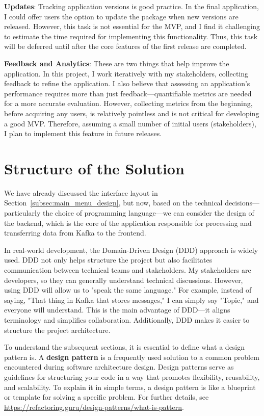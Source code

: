 \documentclass[10pt , a4paper]{report}
\begin{document}
\textbf{Updates}: Tracking application versions is good practice. In the final application, I could offer users the option to update the package when new versions are released. However, this task is not essential for the MVP, and I find it challenging to estimate the time required for implementing this functionality. Thus, this task will be deferred until after the core features of the first release are completed.

\textbf{Feedback and Analytics}: These are two things that help improve the application. In this project, I work iteratively with my stakeholders, collecting feedback to refine the application. I also believe that assessing an application's performance requires more than just feedback—quantifiable metrics are needed for a more accurate evaluation. However, collecting metrics from the beginning, before acquiring any users, is relatively pointless and is not critical for developing a good MVP. Therefore, assuming a small number of initial users (stakeholders), I plan to implement this feature in future releases.

\section{Structure of the Solution}

We have already discussed the interface layout in Section~\ref{subsec:main_menu_design}, but now, based on the technical decisions—particularly the choice of programming language—we can consider the design of the backend, which is the core of the application responsible for processing and transferring data from Kafka to the frontend.

In real-world development, the Domain-Driven Design (DDD) approach is widely used. DDD not only helps structure the project but also facilitates communication between technical teams and stakeholders. My stakeholders are developers, so they can generally understand technical discussions. However, using DDD will allow us to "speak the same language." For example, instead of saying, "That thing in Kafka that stores messages," I can simply say "Topic," and everyone will understand. This is the main advantage of DDD—it aligns terminology and simplifies collaboration. Additionally, DDD makes it easier to structure the project architecture.

To understand the subsequent sections, it is essential to define what a design pattern is. A \textbf{design pattern} is a frequently used solution to a common problem encountered during software architecture design. Design patterns serve as guidelines for structuring your code in a way that promotes flexibility, reusability, and scalability. To explain it in simple terms, a design pattern is like a blueprint or template for solving a specific problem. For further details, see \url{https://refactoring.guru/design-patterns/what-is-pattern}.
\end{document}

